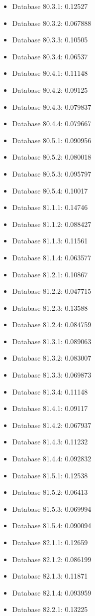 \begin{itemize}
\item Database 80.3.1: 0.12527
\item Database 80.3.2: 0.067888
\item Database 80.3.3: 0.10505
\item Database 80.3.4: 0.06537
\item Database 80.4.1: 0.11148
\item Database 80.4.2: 0.09125
\item Database 80.4.3: 0.079837
\item Database 80.4.4: 0.079667
\item Database 80.5.1: 0.090956
\item Database 80.5.2: 0.080018
\item Database 80.5.3: 0.095797
\item Database 80.5.4: 0.10017
\item Database 81.1.1: 0.14746
\item Database 81.1.2: 0.088427
\item Database 81.1.3: 0.11561
\item Database 81.1.4: 0.063577
\item Database 81.2.1: 0.10867
\item Database 81.2.2: 0.047715
\item Database 81.2.3: 0.13588
\item Database 81.2.4: 0.084759
\item Database 81.3.1: 0.089063
\item Database 81.3.2: 0.083007
\item Database 81.3.3: 0.069873
\item Database 81.3.4: 0.11148
\item Database 81.4.1: 0.09117
\item Database 81.4.2: 0.067937
\item Database 81.4.3: 0.11232
\item Database 81.4.4: 0.092832
\item Database 81.5.1: 0.12538
\item Database 81.5.2: 0.06413
\item Database 81.5.3: 0.069994
\item Database 81.5.4: 0.090094
\item Database 82.1.1: 0.12659
\item Database 82.1.2: 0.086199
\item Database 82.1.3: 0.11871
\item Database 82.1.4: 0.093959
\item Database 82.2.1: 0.13225

\end{itemize}
